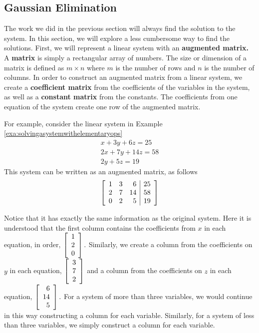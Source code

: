 \subsection{Gaussian Elimination}

The work we did in the previous section will always find the solution to the system. In this section, we will explore a less cumbersome way to 
find the solutions. First, we will represent a linear system with an \textbf{augmented matrix.} 
A \textbf{matrix}  is simply a rectangular array of numbers. The size or dimension of a matrix  is defined as $m\times n$ where $m$ is the
number of rows and $n$ is the number of columns. In order to construct an augmented matrix
from a linear system, we create a \textbf{coefficient matrix} from the coefficients of the variables in the system, as well as a
\textbf{constant matrix} from the constants. The coefficients from one equation of the system create one row of the augmented matrix. 

For example, consider the linear system in Example \ref{exa:solvingasystemwithelementaryops}
\begin{equation*}
\begin{array}{c}
x+3y+6z=25 \\
2x+7y+14z=58 \\
2y+5z=19
\end{array}
\end{equation*}
This system can be written as an augmented matrix, as follows \:
\begin{equation*}
\left[ 
\begin{array}{rrr|r}
1 & 3 & 6 & 25 \\
2 & 7 & 14 & 58 \\
0 & 2 & 5 & 19
\end{array}
\right] 
\end{equation*}

Notice that it has exactly the same information as the original system. Here it is
understood that the first column contains the coefficients from $x$ in each equation, in order,   
$\left[
\begin{array}{r}
1 \\
2 \\
0
\end{array}
\right] .$ Similarly, we create a column from the coefficients on $y$ in each equation, $\left[
\begin{array}{r}
3 \\
7 \\
2
\end{array}
\right] $ and a column from the coefficients on $z$ in each equation, $\left[
\begin{array}{r}
6 \\
14 \\
5
\end{array}
\right] .$ For a system of more than three variables, we would continue in this way constructing a column for each variable.
Similarly, for a system of less than three variables, we simply construct a column for each variable. 

